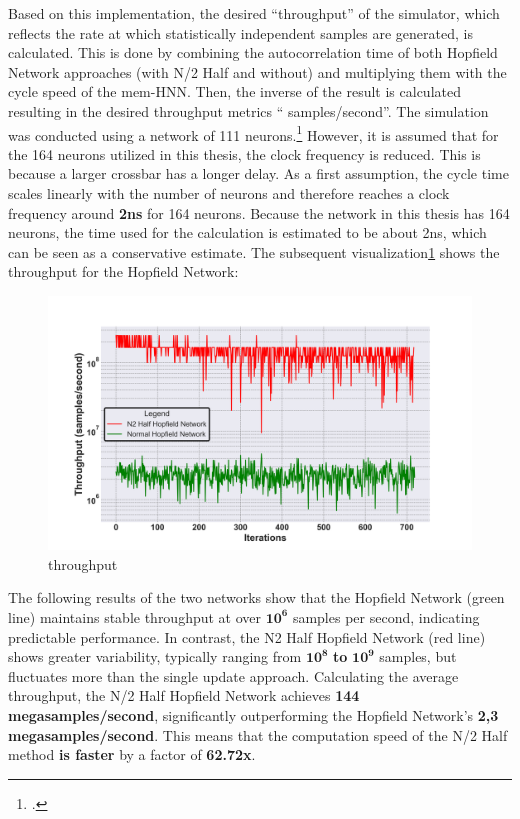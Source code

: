 Based on this implementation, the desired ``throughput'' of the simulator, which reflects the rate at which statistically independent samples are generated, is calculated.
This is done by combining the autocorrelation time of both Hopfield Network approaches (with N/2 Half and without) and multiplying them with the cycle speed of the \ac{mem-HNN}.
Then, the inverse of the result is calculated resulting in the desired throughput metrics `` samples/second''.
The simulation was conducted using a network of 111 neurons.\footcite[cf.][4]{hizzaniMemristorbasedHardwareAlgorithms2023}
However, it is assumed that for the 164 neurons utilized in this thesis, the clock frequency is reduced.
This is because a larger crossbar has a longer delay.
As a first assumption, the cycle time scales linearly with the number of neurons and therefore reaches a clock frequency around \textbf{2ns} for 164 neurons.
Because the network in this thesis has 164 neurons, the time used for the calculation is estimated to be about 2ns, which can be seen as a conservative estimate.
The subsequent visualization\ref{Throughput comparison} shows the throughput for the Hopfield Network:
\begin{figure}[H]
    \centering
    \includegraphics[width=0.7\linewidth]{graphics/Visualisierungen_throughput_log_2.png}
    \caption{throughput}
    \label{Throughput comparison}
\end{figure}
The following results of the two networks show that the Hopfield Network (green line) maintains stable throughput at over \(\mathbf{10^6}\) samples per second, indicating predictable performance.
In contrast, the N2 Half Hopfield Network (red line) shows greater variability, typically ranging from \(\mathbf{10^8}\) \textbf{to} \(\mathbf{10^9}\) samples, but fluctuates more than the single update approach.
Calculating the average throughput, the N/2 Half Hopfield Network achieves \textbf{144 megasamples/second}, significantly outperforming the Hopfield Network's \textbf{2,3 megasamples/second}.
This means that the computation speed of the N/2 Half method \textbf{is faster} by a factor of \textbf{62.72x}.
